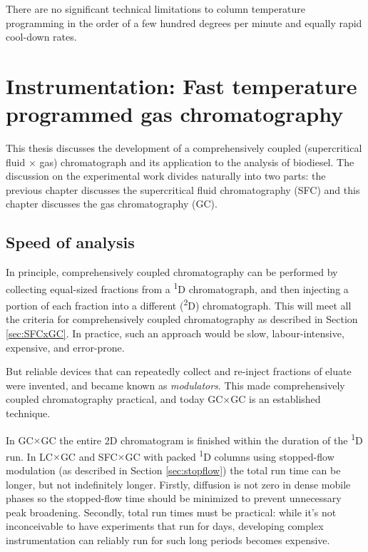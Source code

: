 
\begin{savequote}[45mm]
There are no significant technical limitations
to column temperature programming in the
order of a few hundred degrees per minute and
equally rapid cool-down rates.
\end{savequote}

\chapter{Instrumentation: Fast temperature programmed gas chromatography} %

\label{Chapter5} %


This thesis discusses the development of a comprehensively coupled
(supercritical fluid × gas) chromatograph and its application to the analysis of
biodiesel. The discussion on the experimental work divides naturally into two
parts: the previous chapter discusses the supercritical fluid chromatography (SFC) and
this chapter discusses the gas chromatography (GC).


\section{Speed of analysis}

In principle, comprehensively coupled chromatography can be performed by
collecting equal-sized fractions from a \textsuperscript{1}D chromatograph, and
then injecting a portion of each fraction into a different
(\textsuperscript{2}D) chromatograph. This will meet all the criteria for
comprehensively coupled chromatography as described in Section \ref{sec:SFCxGC}.
In practice, such an approach would be slow, labour-intensive, expensive, and
error-prone.

But reliable devices that can repeatedly collect and re-inject fractions of
eluate were invented, and became known as \textit{modulators}. This made
comprehensively coupled chromatography practical, and today GC$\times$GC is an
established technique.

In GC$\times$GC the entire 2D chromatogram is finished within the duration of
the \textsuperscript{1}D run. In LC$\times$GC and SFC$\times$GC with packed
\textsuperscript{1}D columns using stopped-flow modulation (as described in
Section \ref{sec:stopflow}) the total run time can be longer, but not
indefinitely longer. Firstly, diffusion is not zero in dense mobile phases so
the stopped-flow time should be minimized to prevent unnecessary peak
broadening. Secondly, total run times must be practical: while it's not
inconceivable to have experiments that run for days, developing complex
instrumentation can reliably run for such long periods becomes expensive.

